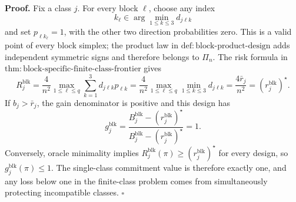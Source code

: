 \textbf{Proof.}
Fix a class \(j\). For every block \(\ell\), choose any index
\[
k_\ell\in\arg\min_{1\le k\le3}d_{j\ell k}
\]
and set \(p_{\ell k_\ell}=1\), with the other two direction probabilities zero. This is a valid point of every block simplex; the product law in \(\mathrm{def:block\text{-}product\text{-}design}\) adds independent symmetric signs and therefore belongs to \(\Pi_n\). The risk formula in \(\mathrm{thm:block\text{-}specific\text{-}finite\text{-}class\text{-}frontier}\) gives
\[
R_j^{\mathrm{blk}}
=\frac4{n^2}\max_{1\le\ell\le q}
\sum_{k=1}^3d_{j\ell k}p_{\ell k}
=\frac4{n^2}\max_{1\le\ell\le q}
\min_{1\le k\le3}d_{j\ell k}
=\frac{4\bar r_j}{n^2}
=(r_j^{\mathrm{blk}})^\star.
\]
If \(b_j>\bar r_j\), the gain denominator is positive and this design has
\[
g_j^{\mathrm{blk}}
=\frac{B_j^{\mathrm{blk}}-(r_j^{\mathrm{blk}})^\star}
{B_j^{\mathrm{blk}}-(r_j^{\mathrm{blk}})^\star}=1.
\]
Conversely, oracle minimality implies \(R_j^{\mathrm{blk}}(\pi)\ge(r_j^{\mathrm{blk}})^\star\) for every design, so \(g_j^{\mathrm{blk}}(\pi)\le1\). The single-class commitment value is therefore exactly one, and any loss below one in the finite-class problem comes from simultaneously protecting incompatible classes. \(\square\)